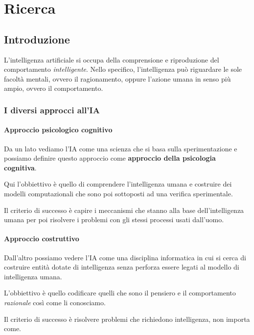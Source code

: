 \part{Ricerca}
\chapter{Introduzione}
L'intelligenza artificiale si occupa della comprensione e riproduzione del
comportamento \emph{intelligente}. Nello specifico, l'intelligenza pu\`o riguardare
le sole facolt\`a mentali, ovvero il ragionamento, oppure l'azione umana in senso
pi\`u ampio, ovvero il comportamento.

\section{I diversi approcci all'IA}
\subsection{Approccio psicologico cognitivo}
Da un lato vediamo l'IA come una scienza che si basa sulla sperimentazione e possiamo
definire questo approccio come \textbf{approccio della psicologia cognitiva}.

Qui  l'obbiettivo \`e quello di comprendere l'intelligenza umana e costruire dei
modelli computazionali che sono poi sottoposti ad una verifica sperimentale.

Il criterio di successo \`e capire i meccanismi che stanno alla base
dell'intelligenza umana per poi risolvere i problemi con gli stessi processi usati
dall'uomo.

\subsection{Approccio costruttivo}
Dall'altro possiamo vedere l'IA come una disciplina informatica in cui si cerca di
costruire entit\`a dotate di intelligenza senza perforza essere legati al modello di
intelligenza umana.

L'obbiettivo \`e quello codificare quelli che sono il pensiero e il comportamento
\emph{razionale} cos\`i come li conosciamo.

Il criterio di successo \`e risolvere problemi che richiedono intelligenza, non
importa come.

